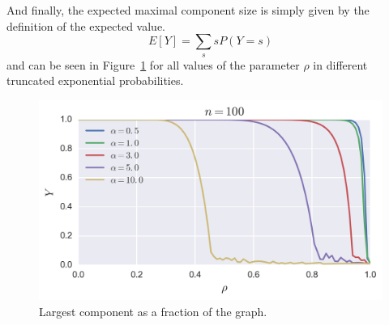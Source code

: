 And finally, the expected maximal component size is simply given by the definition of the expected value.
\begin{equation}
	E[Y] = \sum_s s P(Y=s)
\end{equation}
and can be seen in Figure~\ref{fig:gnp_largest_component} for all values of  the parameter $\rho$ in different truncated exponential probabilities.



\begin{figure}[hb]
	\centering
	\includegraphics[scale=1.1]{figures/3_largest_component.png}
	\caption{Largest component as a fraction of the graph.}
	\label{fig:gnp_largest_component}
\end{figure}













